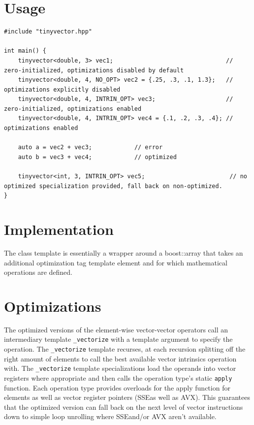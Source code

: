 \documentclass[a4paper]{scrartcl}
\newcommand{\sse}{SSE}
\begin{document}
\section*{Usage}
\begin{lstlisting}
#include "tinyvector.hpp"

int main() {
    tinyvector<double, 3> vec1;                                // zero-initialized, optimizations disabled by default
    tinyvector<double, 4, NO_OPT> vec2 = {.25, .3, .1, 1.3};   // optimizations explicitly disabled
    tinyvector<double, 4, INTRIN_OPT> vec3;                    // zero-initialized, optimizations enabled
    tinyvector<double, 4, INTRIN_OPT> vec4 = {.1, .2, .3, .4}; // optimizations enabled

    auto a = vec2 + vec3;            // error
    auto b = vec3 + vec4;            // optimized

    tinyvector<int, 3, INTRIN_OPT> vec5;                        // no optimized specialization provided, fall back on non-optimized.
}
\end{lstlisting}

\section*{Implementation}
The class template \tinyvector is essentially a wrapper around a boost::array that takes an additional optimization tag template element and for which mathematical operations are defined.

\section*{Optimizations}
The optimized versions of the element-wise vector-vector operators call an intermediary template \texttt{\_vectorize} with a template argument to specify the operation.
The \texttt{\_vectorize} template recurses, at each recursion splitting off the right amount of elements to call the best available vector intrinsics operation with. The \texttt{\_vectorize} template specializations load the operands into vector registers where appropriate and then calls the operation type's static \texttt{apply} function.
Each operation type provides overloads for the apply function for elements as well as vector register pointers (\sse as well as AVX). This guarantees that the optimized version can fall back on the next level of vector instructions down to simple loop unrolling where \sse and/or AVX aren't available.
\end{document}
